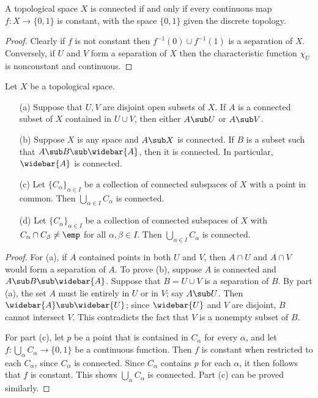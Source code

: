 \begin{proposition}\label{topo space connected iff continuous map to 0,1}
A topological space $X$ is connected if and only if every continuous map $f:X\to\{0,1\}$ is constant, with the space $\{0,1\}$ given the discrete topology.
\end{proposition}
\begin{proof}
Clearly if $f$ is not constant then $f^{-1}(0)\cup f^{-1}(1)$ is a separation of $X$. Conversely, if $U$ and $V$ form a separation of $X$ then the characteristic function $\chi_U$ is nonconstant and continuous.
\end{proof}
\begin{proposition}\label{topo space connected prop}
Let $X$ be a topological space.
\begin{itemize}
\item[(a)] Suppose that $U,V$ are disjoint open subsets of $X$. If $A$ is a connected subset of $X$ contained in $U\cup V$, then either $A\sub U$ or $A\sub V$.
\item[(b)] Suppose $X$ is any space and $A\sub X$ is connected. If $B$ is a subset such that $A\sub B\sub\widebar{A}$, then it is connected. In particular, $\widebar{A}$ is connected.
\item[(c)] Let $\{C_{\alpha}\}_{\alpha\in I}$ be a collection of connected subspaces of $X$ with a point in common. Then $\bigcup_{\alpha\in I}C_\alpha$ is connected.
\item[(d)] Let $\{C_{\alpha}\}_{\alpha\in I}$ be a collection of connected subspaces of $X$ with $C_\alpha\cap C_\beta\neq\emp$ for all $\alpha,\beta\in I$. Then $\bigcup_{\alpha\in I}C_\alpha$ is connected. 
\end{itemize}
\end{proposition}
\begin{proof}
For (a), if $A$ contained points in both $U$ and $V$, then $A\cap U$ and $A\cap V$ would form a separation of $A$. To prove (b), suppose $A$ is connected and $A\sub B\sub\widebar{A}$. Suppose that $B=U\cup V$ is a separation of $B$. By part (a), the set $A$ must lie entirely in $U$ or in $V$; say $A\sub U$. Then $\widebar{A}\sub\widebar{U}$; since $\widebar{U}$ and $V$ are disjoint, $B$ cannot intersect $V$. This contradicts the fact that $V$ is a nonempty subset of $B$.\par
For part (c), let $p$ be a point that is contained in $C_\alpha$ for every $\alpha$, and let $f:\bigcup_\alpha C_\alpha\to\{0,1\}$ be a continuous function. Then $f$ is constant when restricted to each $C_\alpha$, since $C_\alpha$ is connected. Since $C_\alpha$ contains $p$ for each $\alpha$, it then follows that $f$ is constant. This shows $\bigcup_{\alpha}C_\alpha$ is connected. Part (c) can be proved similarly.
\end{proof}
